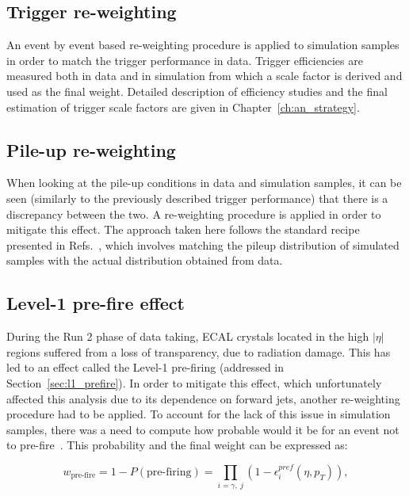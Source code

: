 \subsection{Trigger re-weighting}
\hspace{10pt} An event by event based re-weighting procedure is applied to simulation samples in order to match the trigger performance in data. Trigger efficiencies are measured both in data and in simulation from which a scale factor is derived and used as the final weight. Detailed description of efficiency studies and the final estimation of trigger scale factors are given in Chapter~\ref{ch:an_strategy}.

\subsection{Pile-up re-weighting}
\hspace{10pt} When looking at the pile-up conditions in data and simulation samples, it can be seen (similarly to the previously described trigger performance) that there is a discrepancy between the two. A re-weighting procedure is applied in order to mitigate this effect. The approach taken here follows the standard recipe presented in Refs.~\cite{note:AN_19_257,twiki_lumi_pog}, which involves matching the pileup distribution of simulated samples with the actual distribution obtained from data. 

\subsection{Level-1 pre-fire effect}
\hspace{10pt} During the Run 2 phase of data taking, ECAL crystals located in the high $|\eta|$ regions suffered from a loss of transparency, due to radiation damage. This has led to an effect called the Level-1 pre-firing (addressed in Section~\ref{sec:l1_prefire}). In order to mitigate this effect, which unfortunately affected this analysis due to its dependence on forward jets, another re-weighting procedure had to be applied. To account for the lack of this issue in simulation samples, there was a need to compute how probable would it be for an event not to pre-fire~\cite{twiki_egamma_prefire}. This probability and the final weight can be expressed as:

\begin{equation}
    w_{\text{pre-fire}} = 1-P(\text{pre-firing}) = \prod_{i=\gamma,~j} (1-\epsilon_i^{pref}(\eta,p_T)),
\end{equation}

